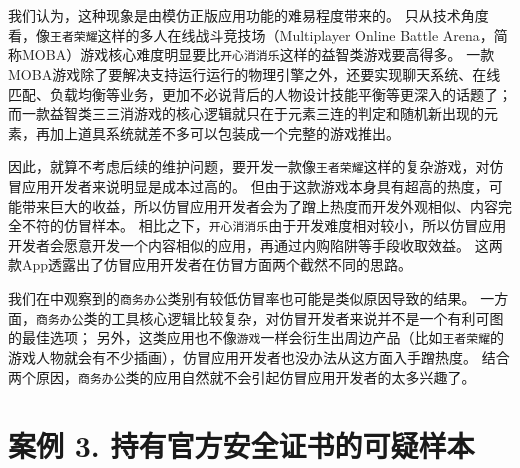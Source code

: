 我们认为，这种现象是由模仿正版应用功能的难易程度带来的。
只从技术角度看，像\texttt{王者荣耀}这样的多人在线战斗竞技场（Multiplayer Online Battle Arena，简称MOBA）游戏核心难度明显要比\texttt{开心消消乐}这样的益智类游戏要高得多。
一款MOBA游戏除了要解决支持运行运行的物理引擎之外，还要实现聊天系统、在线匹配、负载均衡等业务，更加不必说背后的人物设计技能平衡等更深入的话题了；而一款益智类三三消游戏的核心逻辑就只在于元素三连的判定和随机新出现的元素，再加上道具系统就差不多可以包装成一个完整的游戏推出。

因此，就算不考虑后续的维护问题，要开发一款像\texttt{王者荣耀}这样的复杂游戏，对仿冒应用开发者来说明显是成本过高的。
但由于这款游戏本身具有超高的热度，可能带来巨大的收益，所以仿冒应用开发者会为了蹭上热度而开发外观相似、内容完全不符的仿冒样本。
相比之下，\texttt{开心消消乐}由于开发难度相对较小，所以仿冒应用开发者会愿意开发一个内容相似的应用，再通过内购陷阱等手段收取效益。
这两款App透露出了仿冒应用开发者在仿冒方面两个截然不同的思路。

我们在中观察到的\texttt{商务办公}类别有较低仿冒率也可能是类似原因导致的结果。
一方面，\texttt{商务办公}类的工具核心逻辑比较复杂，对仿冒开发者来说并不是一个有利可图的最佳选项；
另外，这类应用也不像\texttt{游戏}一样会衍生出周边产品（比如\texttt{王者荣耀}的游戏人物就会有不少插画），仿冒应用开发者也没办法从这方面入手蹭热度。
结合两个原因，\texttt{商务办公}类的应用自然就不会引起仿冒应用开发者的太多兴趣了。

\section{案例 3. 持有官方安全证书的可疑样本}

